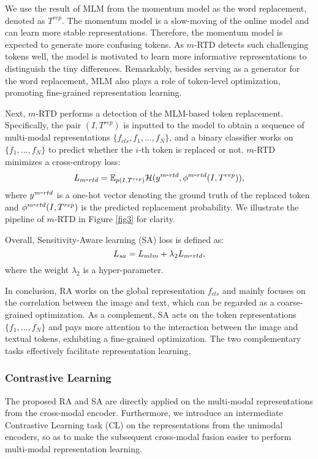 \documentclass{article}
\begin{document}
We use the result of MLM from the momentum model as the word replacement, denoted as $T^{rep}$.
The momentum model is a slow-moving of the online model and can learn more stable representations. Therefore, the momentum model is expected to generate more confusing tokens.
As $m$-RTD detects such challenging tokens well, the model is motivated to learn more informative representations to distinguish the tiny differences.
Remarkably, besides serving as a generator for the word replacement, MLM also plays a role of token-level optimization, promoting fine-grained representation learning.

Next, $m$-RTD performs a detection of the MLM-based token replacement. Specifically, the pair $(I, T^{rep})$ is inputted to the model to obtain a sequence of multi-modal representations $\{f_{cls}, f_1, ..., f_N\}$, and a binary classifier works on $\{f_1, ..., f_N\}$ to predict whether the $i$-th token is replaced or not.
$m$-RTD minimizes a cross-entropy loss:
\begin{equation}
    L_{m\raisebox{0mm}{-}rtd} = \mathbb{E}_{p(I, T^{rep})}{\mathcal{H}}(y^{m\raisebox{0mm}{-}rtd}, \phi^{m\raisebox{0mm}{-}rtd}(I, T^{rep})), \label{equ5}
\end{equation}
where $y^{m\raisebox{0mm}{-}rtd}$ is a one-hot vector denoting the ground truth of the replaced token and $\phi^{m\raisebox{0mm}{-}rtd}(I, T^{rep})$ is the predicted replacement probability.
We illustrate the pipeline of $m$-RTD in Figure \ref{fig3} for clarity.

Overall, Sensitivity-Aware learning (SA) loss is defined as:
\begin{equation}
    L_{sa} = L_{mlm} + \lambda_2L_{m\raisebox{0mm}{-}rtd}, \label{equ6}
\end{equation}
where the weight $\lambda_2$ is a hyper-parameter.

In conclusion, RA works on the global representation $f_{cls}$ and mainly focuses on the correlation between the image and text, which can be regarded as a coarse-grained optimization.
As a complement, SA acts on the token representations $\{f_1, ..., f_N\}$ and pays more attention to the interaction between the image and textual tokens, exhibiting a fine-grained optimization.
The two complementary tasks effectively facilitate representation learning.


\subsubsection{Contrastive Learning}
The proposed RA and SA are directly applied on the multi-modal representations from the cross-modal encoder.
Furthermore, we introduce an intermediate Contrastive Learning task (CL) on the representations from the unimodal encoders, so as to make the subsequent cross-modal fusion easier to perform multi-modal representation learning.
\end{document}
